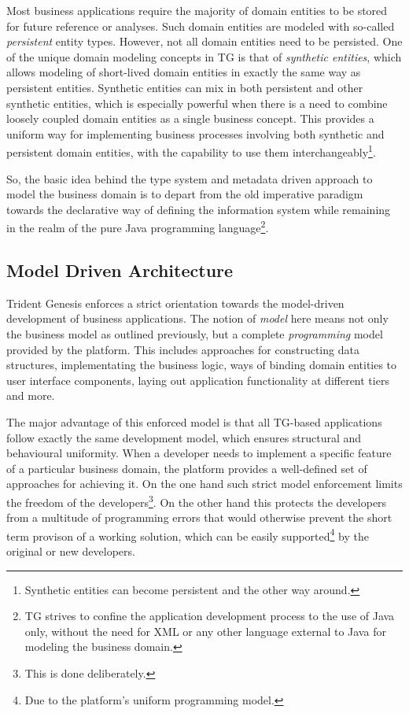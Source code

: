   Most business applications require the majority of domain entities to be stored for future reference or analyses.
  Such domain entities are modeled with so-called \emph{persistent} entity types.
  However, not all domain entities need to be persisted.
  One of the unique domain modeling concepts in TG is that of \emph{synthetic entities}, which allows modeling of short-lived domain entities in exactly the same way as persistent entities.
  Synthetic entities can mix in both persistent and other synthetic entities, which is especially powerful when there is a need to combine loosely coupled domain entities as a single business concept.
  This provides a uniform way for implementing business processes involving both synthetic and persistent domain entities, with the capability to use them interchangeably\footnote{Synthetic entities can become persistent and the other way around.}.

  So, the basic idea behind the type system and metadata driven approach to model the business domain is to depart from the old imperative paradigm towards the declarative way of defining the information system while remaining in the realm of the pure Java programming language\footnote{TG strives to confine the application development process to the use of Java only, without the need for XML or any other language external to Java for modeling the business domain.}.
  
  \subsection{Model Driven Architecture}
  Trident Genesis enforces a strict orientation towards the model-driven development of business applications.
  The notion of \emph{model} here means not only the business model as outlined previously, but a complete \emph{programming} model provided by the platform.
  This includes approaches for constructing data structures, implementating the business logic, ways of binding domain entities to user interface components, laying out application functionality at different tiers and more.

  The major advantage of this enforced model is that all TG-based applications follow exactly the same development model, which ensures structural and behavioural uniformity.
  When a developer needs to implement a specific feature of a particular business domain, the platform provides a well-defined set of approaches for achieving it.
  On the one hand such strict model enforcement limits the freedom of the developers\footnote{This is done deliberately.}.
  On the other hand this protects the developers from a multitude of programming errors that would otherwise prevent the short term provison of a working solution, which can be easily supported\footnote{Due to the platform's uniform programming model.} by the original or new developers.

